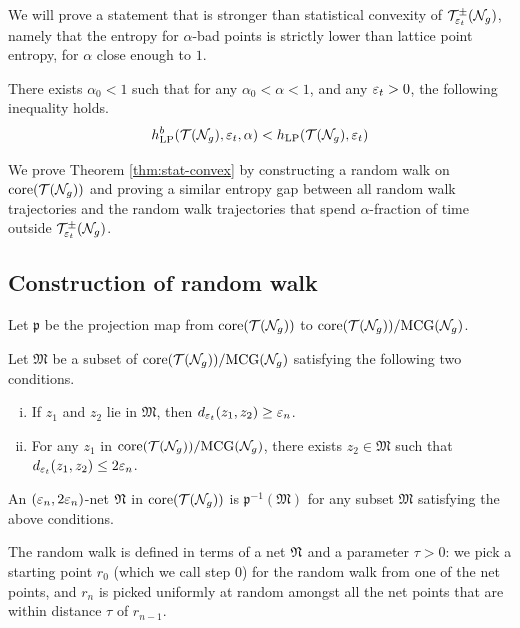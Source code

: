 \documentclass[12pt, reqno]{amsart}
\begin{document}
We will prove a statement that is stronger than statistical convexity of $\mathcal{T}_{\varepsilon_t}^{\pm}(\mathcal{N}_g)$, namely that the entropy for $\alpha$-bad points is strictly lower than lattice point entropy, for $\alpha$ close enough to $1$.

\begin{theorem}
  \label{thm:stat-convex}
  There exists $\alpha_0 < 1$ such that for any $\alpha_0 < \alpha < 1$, and any $\varepsilon_t > 0$, the following inequality holds.
  \begin{align*}
    h_{\mathrm{LP}}^b(\mathcal{T}(\mathcal{N}_g), \varepsilon_t, \alpha) < h_{\mathrm{LP}}(\mathcal{T}(\mathcal{N}_g), \varepsilon_t)
  \end{align*}
\end{theorem}

We prove Theorem \ref{thm:stat-convex} by constructing a random walk on $\mathrm{core}(\mathcal{T}(\mathcal{N}_g))$ and proving a similar entropy gap between all random walk trajectories and the random walk trajectories that spend $\alpha$-fraction of time outside $\mathcal{T}_{\varepsilon_t}^{\pm}(\mathcal{N}_g)$.

\subsection{Construction of random walk}
\label{sec:constr-rand-walk}

Let $\mathfrak{p}$ be the projection map from $\mathrm{core}(\mathcal{T}(\mathcal{N}_g))$ to $\mathrm{core}(\mathcal{T}(\mathcal{N}_g)) / \mathrm{MCG}(\mathcal{N}_g)$.

\begin{definition}
  Let $\mathfrak{M}$ be a subset of $\mathrm{core}(\mathcal{T}(\mathcal{N}_g)) / \mathrm{MCG}(\mathcal{N}_g)$ satisfying the following two conditions.
  \begin{enumerate}[(i)]
  \item If $z_1$ and $z_2$ lie in $\mathfrak{M}$, then $d_{\varepsilon_t}(z_1, z_2) \geq \varepsilon_n$.
  \item For any $z_1$ in $\mathrm{core}(\mathcal{T}(\mathcal{N}_g)) / \mathrm{MCG}(\mathcal{N}_g)$, there exists $z_2 \in \mathfrak{M}$ such that $d_{\varepsilon_t}(z_1, z_2) \leq 2 \varepsilon_n$.
  \end{enumerate}
  An $(\varepsilon_n, 2\varepsilon_n)$-net $\mathfrak{N}$ in $\mathrm{core}(\mathcal{T}(\mathcal{N}_g))$ is $\mathfrak{p}^{-1}(\mathfrak{M})$ for any subset $\mathfrak{M}$ satisfying the above conditions.
\end{definition}

The random walk is defined in terms of a net $\mathfrak{N}$ and a parameter $\tau > 0$: we pick a starting point $r_0$ (which we call step $0$) for the random walk from one of the net points, and $r_n$ is picked uniformly at random amongst all the net points that are within distance $\tau$ of $r_{n-1}$.
\end{document}
